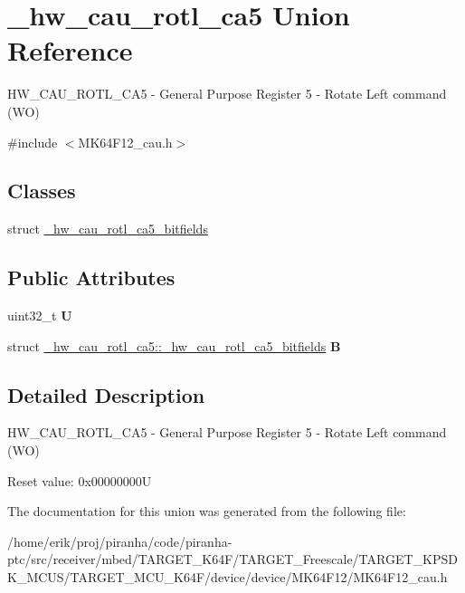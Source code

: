 \hypertarget{union__hw__cau__rotl__ca5}{}\section{\+\_\+hw\+\_\+cau\+\_\+rotl\+\_\+ca5 Union Reference}
\label{union__hw__cau__rotl__ca5}


H\+W\+\_\+\+C\+A\+U\+\_\+\+R\+O\+T\+L\+\_\+\+C\+A5 -\/ General Purpose Register 5 -\/ Rotate Left command (WO)  




{\ttfamily \#include $<$M\+K64\+F12\+\_\+cau.\+h$>$}

\subsection*{Classes}
\begin{DoxyCompactItemize}
\item 
struct \hyperlink{struct__hw__cau__rotl__ca5_1_1__hw__cau__rotl__ca5__bitfields}{\+\_\+hw\+\_\+cau\+\_\+rotl\+\_\+ca5\+\_\+bitfields}
\end{DoxyCompactItemize}
\subsection*{Public Attributes}
\begin{DoxyCompactItemize}
\item 
uint32\+\_\+t {\bfseries U}\hypertarget{union__hw__cau__rotl__ca5_ae8f9e4bd0508da964e467c45d79482e1}{}\label{union__hw__cau__rotl__ca5_ae8f9e4bd0508da964e467c45d79482e1}

\item 
struct \hyperlink{struct__hw__cau__rotl__ca5_1_1__hw__cau__rotl__ca5__bitfields}{\+\_\+hw\+\_\+cau\+\_\+rotl\+\_\+ca5\+::\+\_\+hw\+\_\+cau\+\_\+rotl\+\_\+ca5\+\_\+bitfields} {\bfseries B}\hypertarget{union__hw__cau__rotl__ca5_a67af981f21aedceafaf983cb5bd3f60f}{}\label{union__hw__cau__rotl__ca5_a67af981f21aedceafaf983cb5bd3f60f}

\end{DoxyCompactItemize}


\subsection{Detailed Description}
H\+W\+\_\+\+C\+A\+U\+\_\+\+R\+O\+T\+L\+\_\+\+C\+A5 -\/ General Purpose Register 5 -\/ Rotate Left command (WO) 

Reset value\+: 0x00000000U 

The documentation for this union was generated from the following file\+:\begin{DoxyCompactItemize}
\item 
/home/erik/proj/piranha/code/piranha-\/ptc/src/receiver/mbed/\+T\+A\+R\+G\+E\+T\+\_\+\+K64\+F/\+T\+A\+R\+G\+E\+T\+\_\+\+Freescale/\+T\+A\+R\+G\+E\+T\+\_\+\+K\+P\+S\+D\+K\+\_\+\+M\+C\+U\+S/\+T\+A\+R\+G\+E\+T\+\_\+\+M\+C\+U\+\_\+\+K64\+F/device/device/\+M\+K64\+F12/M\+K64\+F12\+\_\+cau.\+h\end{DoxyCompactItemize}
